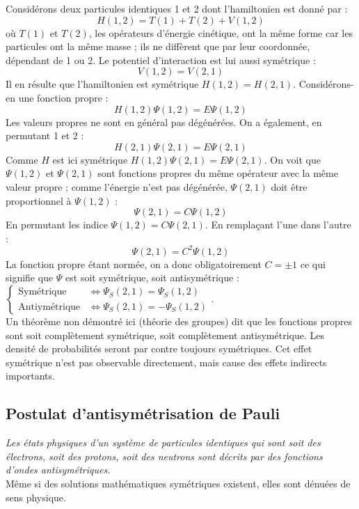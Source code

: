\documentclass	[11pt, a4paper, openany]{book}
\begin{document}
Considérons deux particules identiques 1 et 2 dont l'hamiltonien est donné par :
\begin{equation}
H(1,2) = T(1)+T(2) + V(1,2)
\end{equation}
où $T(1)$ et $T(2)$, les opérateurs d'énergie cinétique, ont la même forme car les particules ont la même masse ; ils ne diffèrent que par leur coordonnée, dépendant de 1 ou 2. Le potentiel d'interaction est lui aussi symétrique :
\begin{equation}
V(1,2) = V(2,1)
\end{equation}
Il en résulte que l'hamiltonien est symétrique $H(1,2) = H(2,1)$. Considérons-en une fonction propre :
\begin{equation}
H(1,2)\Psi(1,2) = E\Psi(1,2)
\end{equation}
Les valeurs propres ne sont en général pas dégénérées. On a également, en permutant 1 et 2 :
\begin{equation}
H(2,1)\Psi(2,1) = E\Psi(2,1)
\end{equation}
Comme $H$ est ici symétrique $H(1,2)\Psi(2,1) = E\Psi(2,1)$. On voit que $\Psi(1,2)$ et $\Psi(2,1)$ sont fonctions propres du même opérateur avec la même valeur propre ; comme l'énergie n'est pas dégénérée, $\Psi(2,1)$ doit être proportionnel à $\Psi(1,2)$ :
\begin{equation}
\Psi(2,1) = C\Psi(1,2)
\end{equation}
En permutant les indice $\Psi(1,2) = C\Psi(2,1)$. En remplaçant l'une dans l'autre :
\begin{equation}
\Psi(2,1) = C^2\Psi(1,2)
\end{equation}
La fonction propre étant normée, on a donc obligatoirement $C = \pm 1$ ce qui signifie que $\Psi$ est soit symétrique, soit antisymétrique :
$\left\{\begin{array}{ll}
\text{Symétrique} &\Leftrightarrow \Psi_S(2,1) = \Psi_S(1,2)\\
\text{Antiymétrique} &\Leftrightarrow \Psi_S(2,1) = -\Psi_S(1,2)
\end{array}\right.$.\\
Un théorème non démontré ici (théorie des groupes) dit que les fonctions propres sont soit complètement symétrique, soit complètement antisymétrique. Les densité de probabilités seront par contre toujours symétriques. Cet effet symétrique n'est pas observable directement, mais cause des effets indirects importants.

\subsection{Postulat d'antisymétrisation de Pauli}
\textit{Les états physiques d'un système de particules identiques qui sont soit des électrons, soit des protons, soit des neutrons sont décrits par des fonctions d'ondes antisymétriques.}\\
Même si des solutions mathématiques symétriques existent, elles sont dénuées de sens physique.\\
\end{document}
